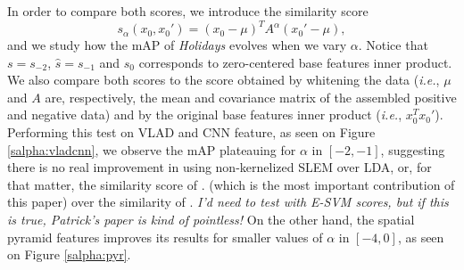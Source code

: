 \documentclass[10pt,twocolumn,letterpaper]{article}
\begin{document}
In order to compare both scores, we introduce the similarity score 
\begin{equation}
s_{\alpha}(x_0,x_0') = (x_0-\mu)^TA^{\alpha}(x_0'-\mu),
\end{equation}
and we study how the mAP of \emph{Holidays} evolves when we vary $\alpha$. Notice that $s=s_{-2}$, $\hat{s}=s_{-1}$ and $s_0$ corresponds to zero-centered base features inner product. We also compare both scores to the score obtained by whitening the data (\emph{i.e.}, $\mu$ and $A$ are, respectively, the mean and covariance matrix of the assembled positive and negative data) and by the original base features inner product (\emph{i.e.}, $x_0^Tx_0'$). 
Performing this test on VLAD and CNN feature, as seen on Figure \ref{salpha:vladcnn}, we observe the mAP plateauing for $\alpha$ in $[-2,-1]$, suggesting there is no real improvement in using non-kernelized SLEM over LDA, or, for that matter, the similarity score of \cite{ZePe15}. (which is the most important contribution of this paper) over the similarity of \cite{Efros11}. \emph{\color{red} I'd need to test with E-SVM scores, but if this is true, Patrick's paper is kind of pointless!}
On the other hand, the spatial pyramid features improves its results for smaller values of $\alpha$ in $[-4,0]$, as seen on Figure \ref{salpha:pyr}.
\end{document}
